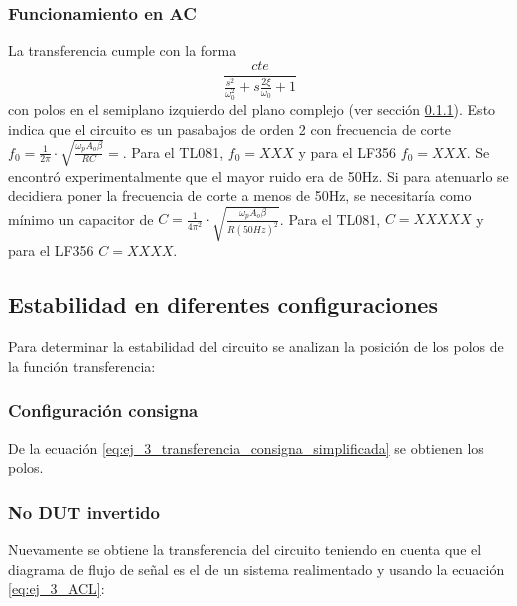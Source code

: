 \documentclass[../../main.tex]{subfiles}
\begin{document}
\subsubsection{Funcionamiento en AC}
La transferencia cumple con la forma 
\[\frac{cte}{\frac{s^2}{\omega_0^2}+s\frac{2\xi}{\omega_0}+1}\]
con polos en el semiplano izquierdo del plano complejo (ver secci\'on \ref{ssec:ej_3_estabilidad_consigna}). Esto indica que el circuito es un pasabajos de orden 2 con frecuencia de corte $f_0=\frac{1}{2\pi}\cdot \sqrt{\frac{\omega_pA_o\beta}{RC}}=$. Para el TL081, $f_0=XXX$ y para el LF356 $f_0=XXX$. Se encontr\'o experimentalmente que el mayor ruido era de 50Hz. Si para atenuarlo se decidiera poner la frecuencia de corte a menos de 50Hz, se necesitar\'ia como m\'inimo un capacitor de $C=\frac{1}{4\pi^2}\cdot \sqrt{\frac{\omega_pA_o\beta}{R(50Hz)^2}}$. Para el TL081, $C=XXXXX$ y para el LF356 $C=XXXX$.



















\subsection{Estabilidad en diferentes configuraciones} 

Para determinar la estabilidad del circuito se analizan la posici\'on de los polos de la funci\'on transferencia:

\subsubsection{Configuraci\'on consigna} \label{ssec:ej_3_estabilidad_consigna}
De la ecuaci\'on \ref{eq:ej_3_transferencia_consigna_simplificada} se obtienen los polos.

\subsubsection{No DUT invertido}

Nuevamente se obtiene la transferencia del circuito teniendo en cuenta que el diagrama de flujo de se\~nal es el de un sistema realimentado y usando la ecuaci\'on \ref{eq:ej_3_ACL}:
\end{document}
